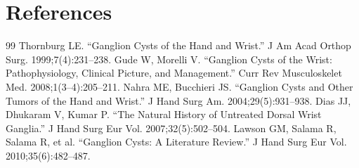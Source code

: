 \section*{References}
\begin{thebibliography}{99}
 Thornburg LE. ``Ganglion Cysts of the Hand and Wrist.'' J Am Acad Orthop Surg. 1999;7(4):231--238.
 Gude W, Morelli V. ``Ganglion Cysts of the Wrist: Pathophysiology, Clinical Picture, and Management.'' Curr Rev Musculoskelet Med. 2008;1(3--4):205--211.
 Nahra ME, Bucchieri JS. ``Ganglion Cysts and Other Tumors of the Hand and Wrist.'' J Hand Surg Am. 2004;29(5):931--938.
 Dias JJ, Dhukaram V, Kumar P. ``The Natural History of Untreated Dorsal Wrist Ganglia.'' J Hand Surg Eur Vol. 2007;32(5):502--504.
 Lawson GM, Salama R, Salama R, et al. ``Ganglion Cysts: A Literature Review.'' J Hand Surg Eur Vol. 2010;35(6):482--487.
\end{thebibliography}
